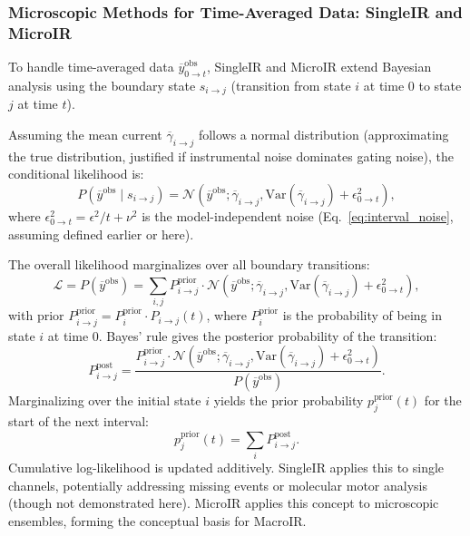 \documentclass[pdflatex,sn-nature]{sn-jnl}%
\begin{document}
\subsubsection{Microscopic Methods for Time-Averaged Data: SingleIR and MicroIR}
\label{sec:microscopic_interval}
To handle time-averaged data \(\overline{y}^{\text{obs}}_{0 \rightarrow t}\), SingleIR and MicroIR extend Bayesian analysis using the boundary state \(s_{i\rightarrow j}\) (transition from state \(i\) at time 0 to state \(j\) at time \(t\)).

Assuming the mean current \(\overline{\gamma}_{i \rightarrow j}\) follows a normal distribution (approximating the true distribution, justified if instrumental noise dominates gating noise), the conditional likelihood is:
\[ %
P\left(\overline{y}^{\text{obs}} \mid s_{i\rightarrow j}\right) = \mathcal{N}\left(\overline{y}^{\text{obs}}; \overline{\gamma}_{i \rightarrow j}, \mathrm{Var}(\overline{\gamma}_{i\rightarrow j}) + \epsilon^2_{0 \rightarrow t}\right),
\]
where \(\epsilon^2_{0 \rightarrow t} = \epsilon^2/t + \nu^2\) is the model-independent noise (Eq.~\ref{eq:interval_noise}, assuming defined earlier or here).

The overall likelihood marginalizes over all boundary transitions:
\[
\mathcal{L} = P\left(\overline{y}^{\text{obs}}\right) = \sum_{i,j} P^{\text{prior}}_{i\rightarrow j} \cdot \mathcal{N}\left(\overline{y}^{\text{obs}}; \overline{\gamma}_{i \rightarrow j}, \mathrm{Var}(\overline{\gamma}_{i\rightarrow j}) + \epsilon^2_{0 \rightarrow t}\right),
\]
with prior \( P^{\text{prior}}_{i\rightarrow j} = P^{\text{prior}}_i \cdot P_{i\rightarrow j}(t) \), where \(P^{\text{prior}}_i\) is the probability of being in state \(i\) at time 0. Bayes' rule gives the posterior probability of the transition:
\[
P^{\text{post}}_{i\rightarrow j} = \frac{P^{\text{prior}}_{i\rightarrow j} \cdot \mathcal{N}\left(\overline{y}^{\text{obs}}; \overline{\gamma}_{i \rightarrow j}, \mathrm{Var}(\overline{\gamma}_{i\rightarrow j}) + \epsilon^2_{0 \rightarrow t}\right)}{P\left(\overline{y}^{\text{obs}}\right)}.
\]
Marginalizing over the initial state \(i\) yields the prior probability \(p_j^{\text{prior}}(t)\) for the start of the next interval:
\begin{equation}
    p_j^{\text{prior}}(t) = \sum_i P^{\text{post}}_{i\rightarrow j}.
    \label{eq:next_prior_short} %
\end{equation}
Cumulative log-likelihood is updated additively. SingleIR applies this to single channels, potentially addressing missing events or molecular motor analysis (though not demonstrated here). MicroIR applies this concept to microscopic ensembles, forming the conceptual basis for MacroIR.
\end{document}
